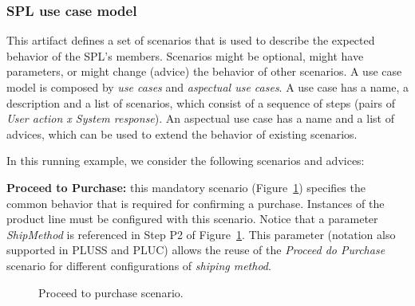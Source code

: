 \documentclass{acm_proc_article-sp}
\begin{document}
\subsubsection{SPL use case model}

This artifact defines a set of scenarios that is used to describe the expected
behavior of the SPL's members. Scenarios might be optional, might have
parameters, or might change (advice) the behavior of other scenarios. A use case model is
composed by \emph{use cases} and \emph{aspectual use cases}. A use case has a
name, a description and a list of scenarios, which consist of a sequence of
steps (pairs of \emph{User action x System response}). An aspectual use case has a name and a list of advices, which can be
used to extend the behavior of existing scenarios.

In this running example, we consider the following scenarios and advices:

{\bf Proceed to Purchase:} this mandatory scenario
(Figure~\ref{fig:proceed-to-checkout}) specifies the common behavior that is
required for confirming a purchase. Instances of the product line must be
configured with this scenario. Notice that a parameter
\emph{ShipMethod} is referenced in Step P2 of
Figure~\ref{fig:proceed-to-checkout}. This parameter (notation
also supported in PLUSS and PLUC) allows the reuse of the \emph{Proceed do
Purchase} scenario for different configurations of \emph{shiping method}.

\begin{figure}[h]
\caption{Proceed to purchase scenario.}
\label{fig:proceed-to-checkout}
\end{figure}
\end{document}
